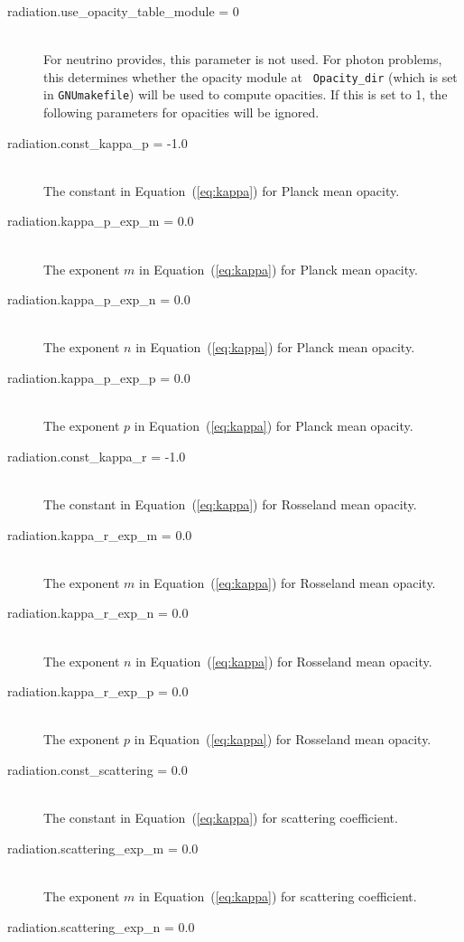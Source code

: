\documentclass[11pt,letterpaper]{article}
\begin{document}
\begin{description}
\item[radiation.use\_opacity\_table\_module = 0] \hfill \\
  For neutrino provides, this parameter is not used.  For photon
  problems, this determines whether the opacity module at {\tt
    Opacity\_dir} (which is set in {\tt GNUmakefile}) will be used to
  compute opacities.  If this is set to 1, the following parameters
  for opacities will be ignored.  
\item[radiation.const\_kappa\_p = -1.0] \hfill \\
  The constant in Equation~(\ref{eq:kappa}) for Planck mean
  opacity. 
\item[radiation.kappa\_p\_exp\_m = 0.0] \hfill \\
  The exponent $m$ in Equation~(\ref{eq:kappa}) for Planck mean
  opacity. 
\item[radiation.kappa\_p\_exp\_n = 0.0] \hfill \\
  The exponent $n$ in Equation~(\ref{eq:kappa}) for Planck mean
  opacity. 
\item[radiation.kappa\_p\_exp\_p = 0.0] \hfill \\
  The exponent $p$ in Equation~(\ref{eq:kappa}) for Planck mean
  opacity. 
\item[radiation.const\_kappa\_r = -1.0] \hfill \\
  The constant in Equation~(\ref{eq:kappa}) for Rosseland mean
  opacity. 
\item[radiation.kappa\_r\_exp\_m = 0.0] \hfill \\
  The exponent $m$ in Equation~(\ref{eq:kappa}) for Rosseland mean
  opacity. 
\item[radiation.kappa\_r\_exp\_n = 0.0] \hfill \\
  The exponent $n$ in Equation~(\ref{eq:kappa}) for Rosseland mean
  opacity. 
\item[radiation.kappa\_r\_exp\_p = 0.0] \hfill \\
  The exponent $p$ in Equation~(\ref{eq:kappa}) for Rosseland mean
  opacity. 
\item[radiation.const\_scattering = 0.0] \hfill \\
  The constant in Equation~(\ref{eq:kappa}) for scattering coefficient.
\item[radiation.scattering\_exp\_m = 0.0] \hfill \\
  The exponent $m$ in Equation~(\ref{eq:kappa}) for scattering coefficient.
\item[radiation.scattering\_exp\_n = 0.0] \hfill \\

\end{description}
\end{document}
